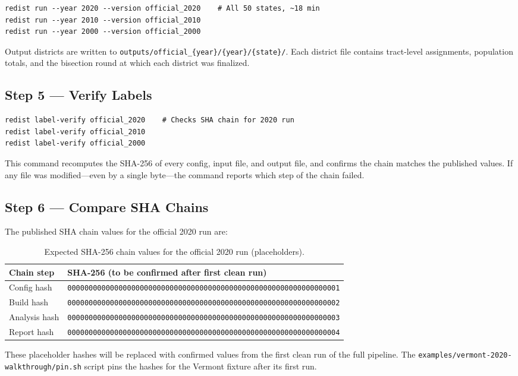 \begin{verbatim}
redist run --year 2020 --version official_2020    # All 50 states, ~18 min
redist run --year 2010 --version official_2010
redist run --year 2000 --version official_2000
\end{verbatim}

\noindent Output districts are written to
\texttt{outputs/official\_\{year\}/\{year\}/\{state\}/}.
Each district file contains tract-level assignments, population totals,
and the bisection round at which each district was finalized.

\subsection*{Step 5 --- Verify Labels}

\begin{verbatim}
redist label-verify official_2020    # Checks SHA chain for 2020 run
redist label-verify official_2010
redist label-verify official_2000
\end{verbatim}

\noindent This command recomputes the SHA-256 of every config, input file,
and output file, and confirms the chain matches the published values.
If any file was modified---even by a single byte---the command reports
which step of the chain failed.

\subsection*{Step 6 --- Compare SHA Chains}

The published SHA chain values for the official 2020 run are:

\begin{table}[h]
\centering
\caption{Expected SHA-256 chain values for the official 2020 run (placeholders).}
\label{tab:sha}
\begin{tabular}{@{}ll@{}}
\toprule
Chain step & SHA-256 (to be confirmed after first clean run) \\
\midrule
Config hash   & \texttt{0000000000000000000000000000000000000000000000000000000000000001} \\
Build hash    & \texttt{0000000000000000000000000000000000000000000000000000000000000002} \\
Analysis hash & \texttt{0000000000000000000000000000000000000000000000000000000000000003} \\
Report hash   & \texttt{0000000000000000000000000000000000000000000000000000000000000004} \\
\bottomrule
\end{tabular}
\end{table}

\noindent These placeholder hashes will be replaced with confirmed values
from the first clean run of the full pipeline.
The \texttt{examples/vermont-2020-walkthrough/pin.sh} script pins the hashes
for the Vermont fixture after its first run.
